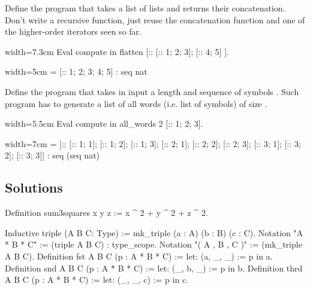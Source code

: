 \begin{Exercise}[label=ex:flatten,difficulty=1,title={List flattening}]
Define the program  that takes a list of lists and returns
their concatenation.  Don't write a recursive function, just reuse
the concatenation function and one of the higher-order iterators
seen so far.

\begin{coq}{}{width=7.3cm}
Eval compute in
  flatten [:: [:: 1; 2; 3]; [:: 4; 5] ].
\end{coq}
\begin{coqout}{}{width=5cm}
 = [:: 1; 2; 3; 4; 5]
 : seq nat
\end{coqout}
\end{Exercise}


\begin{Exercise}[label=ex:allwords,difficulty=2,title={All words of size n}]
Define the  program that takes in input a
length  and sequence of symbols .
Such program has to generate a list of all words (i.e. list
of symbols) of size .

\begin{coq}{}{width=5.5cm}
Eval compute in
  all_words 2 [:: 1; 2; 3].
\end{coq}
\begin{coqout}{}{width=7cm}
 = [:: [:: 1; 1]; [:: 1; 2]; [:: 1; 3];
       [:: 2; 1]; [:: 2; 2]; [:: 2; 3];
       [:: 3; 1]; [:: 3; 2]; [:: 3; 3]]
 : seq (seq nat)
\end{coqout}
\end{Exercise}

\subsection{Solutions}

\begin{Answer}[ref=ex:3sum]
\begin{coq}{}{}
Definition sum3squares x y z := x ^ 2 + y ^ 2 + z ^ 2.
\end{coq}
\end{Answer}

\begin{Answer}[ref=ex:pair]

\begin{coq}{}{}
Inductive triple (A B C: Type) := mk_triple (a : A) (b : B) (c : C).
Notation "A * B * C" := (triple A B C) : type_scope.
Notation "( A , B , C )" := (mk_triple A B C).
Definition fst A B C (p : A * B * C) := let: (a, _, _) := p in a.
Definition snd A B C (p : A * B * C) := let: (_, b, _) := p in b.
Definition thrd A B C (p : A * B * C) := let: (_, _, c) := p in c.
\end{coq}

\end{Answer}


